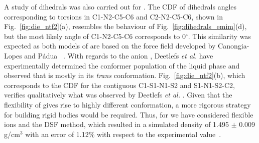 \documentclass[3p,twocolumn]{elsarticle}
\begin{document}
A study of dihedrals was also carried out for \ce{[emim][NTf_2]}. The CDF of dihedrals angles corresponding to torsions in C1-N2-C5-C6 and C2-N2-C5-C6, shown in Fig.~\ref{fig:die_ntf2}(a), resembles the behaviour of Fig.~\ref{fig:dihedrals_emim}(d), but the most likely angle of C1-N2-C5-C6 corresponds to 0$^{\circ}$. This similarity was expected as both models of \ce{[emim]^+} are based on the force field developed by Canongia-Lopes and P\'{a}dua~ \cite{Canongia_Lopes_2006}. With regards to the anion \ce{[NTf_2]^-}, Deetlefs \textit{et al.} \cite{Deetlefs_2006} have experimentally determined the conformer population of the liquid phase and observed that \ce{[NTf_2]^-} is mostly in its \textit{trans} conformation. Fig.~\ref{fig:die_ntf2}(b), which corresponds to the CDF for the contiguous C1-S1-N1-S2 and S1-N1-S2-C2, verifies qualitatively what was observed by Deetlefs \textit{et al.} \cite{Deetlefs_2006}. Given that the flexibility of \ce{[NTf_2]^-} gives rise to highly different conformation, a more rigorous strategy for building rigid bodies would be required. Thus, for \ce{[emim][NTf_2]} we have considered flexible ions and the DSF method, which resulted in a simulated density of 1.495 $\pm$ 0.009 g/cm$^3$ with an error of 1.12\% with respect to the experimental value~\cite{Tokuda_2005}.
\end{document}
